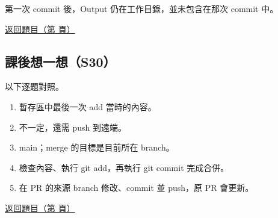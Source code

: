 \documentclass[11pt,a4paper]{article}
\DeclareRobustCommand{\code}[1]{{\small\ttfamily #1}}
\newcommand{\BackLink}[1]{%
    \par\noindent\hyperref[#1]{\textcolor{handoutaccent}{返回題目（第 \pageref*{#1} 頁）}}\par}
\begin{document}
第一次 \code{commit} 後，Output 仍在工作目錄，並未包含在那次 commit 中。

\BackLink{exercise:staging}

\subsection{課後想一想（S30）}
\label{answer:review}

以下逐題對照。

\begin{enumerate}
    \item 暫存區中最後一次 \code{add} 當時的內容。
    \item 不一定，還需 \code{push} 到遠端。
    \item \code{main}；\code{merge} 的目標是目前所在 branch。
    \item 檢查內容、執行 \code{git add}，再執行 \code{git commit} 完成合併。
    \item 在 PR 的來源 branch 修改、commit 並 \code{push}，原 PR 會更新。
\end{enumerate}

\BackLink{exercise:review}
\end{document}
